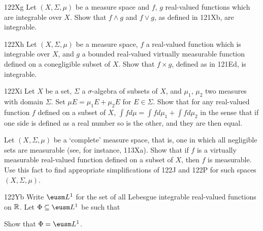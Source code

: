 {\sqheader 122Xg Let $(X,\Sigma,\mu)$ be a measure space and $f$,
$g$ real-valued functions which are integrable over $X$.   Show that
$f\wedge g$ and $f\vee g$, as defined in 121Xb, are integrable.

\sqheader 122Xh Let $(X,\Sigma,\mu)$ be a measure space, $f$ a
real-valued function which is integrable over $X$, and $g$ a bounded
real-valued virtually measurable function defined on a conegligible
subset of $X$.    Show that $f\times g$, defined as in 121Ed, is
integrable.

\spheader 122Xi Let $X$ be a set, $\Sigma$ a $\sigma$-algebra of
subsets
of $X$, and $\mu_1$, $\mu_2$ two measures with domain $\Sigma$.   Set
$\mu E=\mu_1E+\mu_2E$ for $E\in\Sigma$.
Show that for any
real-valued function $f$ defined on a subset of $X$,
$\int fd\mu=\int fd\mu_1+\int fd\mu_2$ in the sense that if one side
is defined as a real
number so is the other, and they are then equal.   

 Let $(X,\Sigma,\mu)$ be a
`complete' measure space, that is, one
in which all negligible sets are measurable (see, for instance,
113Xa). Show that if
$f$ is a virtually measurable real-valued function defined on a subset
of $X$, then $f$ is measurable.   Use this fact to find appropriate
simplifications of 122J and 122P for such spaces $(X,\Sigma,\mu)$.

\spheader 122Yb Write $\eusm L^1$ for the set of all Lebesgue
integrable real-valued functions on
$\Bbb R$.   Let $\Phi\subseteq\eusm L^1$ be such that


\noindent Show that $\Phi=\eusm L^1$.   

}
